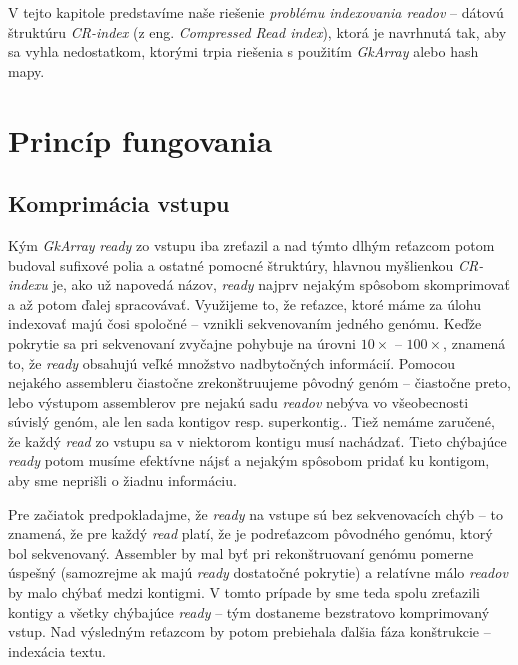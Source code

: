 V tejto kapitole predstavíme naše riešenie \emph{problému indexovania readov} -- dátovú štruktúru \emph{CR-index} (z eng. \emph{Compressed Read index}), ktorá je navrhnutá tak, aby sa vyhla nedostatkom, ktorými trpia riešenia s použitím \emph{GkArray} alebo hash mapy.



\section{Princíp fungovania}

\subsection{Komprimácia vstupu}
Kým \emph{GkArray} \emph{ready} zo vstupu iba zreťazil a nad týmto dlhým reťazcom potom budoval sufixové polia a ostatné pomocné štruktúry, hlavnou myšlienkou \emph{CR-indexu} je, ako už napovedá názov, \emph{ready} najprv nejakým spôsobom skomprimovať a až potom ďalej spracovávať. Využijeme to, že reťazce, ktoré máme za úlohu indexovať majú čosi spoločné -- vznikli sekvenovaním jedného genómu. Keďže pokrytie sa pri sekvenovaní zvyčajne pohybuje na úrovni $10\times$ -- $100\times$, znamená to, že \emph{ready} obsahujú veľké množstvo nadbytočných informácií. Pomocou nejakého assembleru čiastočne zrekonštruujeme pôvodný genóm  -- čiastočne preto, lebo výstupom assemblerov pre nejakú sadu \emph{readov} nebýva vo všeobecnosti súvislý genóm, ale len sada kontigov resp. superkontig.. Tiež nemáme zaručené, že každý \emph{read} zo vstupu sa v niektorom kontigu musí nachádzať. Tieto chýbajúce \emph{ready} potom musíme efektívne nájsť a nejakým spôsobom pridať ku kontigom, aby sme neprišli o žiadnu informáciu.

Pre začiatok predpokladajme, že \emph{ready} na vstupe sú bez sekvenovacích chýb -- to znamená, že pre každý \emph{read} platí, že je podreťazcom pôvodného genómu, ktorý bol sekvenovaný. Assembler by mal byť pri rekonštruovaní genómu pomerne úspešný (samozrejme ak majú \emph{ready} dostatočné pokrytie) a relatívne málo \emph{readov} by malo chýbať medzi kontigmi. V tomto prípade by sme teda spolu zreťazili kontigy a všetky chýbajúce \emph{ready} -- tým dostaneme bezstratovo komprimovaný vstup. Nad výsledným reťazcom by potom prebiehala ďalšia fáza konštrukcie -- indexácia textu.


